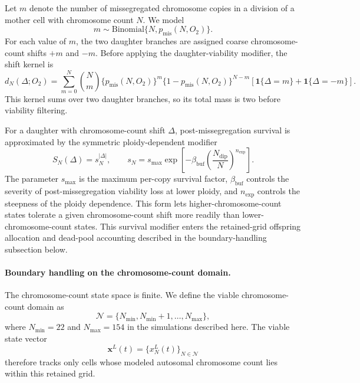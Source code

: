 \documentclass[11pt]{article}
\begin{document}
Let $m$ denote the number of missegregated chromosome copies in a division of a mother cell with chromosome count $N$. We model
\begin{equation}
m \sim \mathrm{Binomial}\{N,p_{\mathrm{mis}}(N,O_2)\}.
\label{eq:appendix_misseg_binomial}
\end{equation}
For each value of $m$, the two daughter branches are assigned coarse chromosome-count shifts $+m$ and $-m$. Before applying the daughter-viability modifier, the shift kernel is
\begin{equation}
d_N(\Delta;O_2)
=
\sum_{m=0}^{N}
\binom{N}{m}
\{p_{\mathrm{mis}}(N,O_2)\}^{m}
\{1-p_{\mathrm{mis}}(N,O_2)\}^{N-m}
\left[
\mathbf{1}\{\Delta=m\}
+
\mathbf{1}\{\Delta=-m\}
\right].
\label{eq:appendix_shift_kernel}
\end{equation}
This kernel sums over two daughter branches, so its total mass is two before viability filtering.

For a daughter with chromosome-count shift $\Delta$, post-missegregation survival is approximated by the symmetric ploidy-dependent modifier
\begin{equation}
S_N(\Delta)=s_N^{|\Delta|},
\qquad
s_N
=
s_{\max}
\exp\left[
-\beta_{\mathrm{buf}}\left(\frac{N_{\mathrm{dip}}}{N}\right)^{n_{\mathrm{exp}}}
\right].
\label{eq:appendix_survival_kernel}
\end{equation}
The parameter $s_{\max}$ is the maximum per-copy survival factor, $\beta_{\mathrm{buf}}$ controls the severity of post-missegregation viability loss at lower ploidy, and $n_{\mathrm{exp}}$ controls the steepness of the ploidy dependence. This form lets higher-chromosome-count states tolerate a given chromosome-count shift more readily than lower-chromosome-count states.
This survival modifier enters the retained-grid offspring allocation and dead-pool accounting described in the boundary-handling subsection below.

\paragraph{Boundary handling on the chromosome-count domain.}
The chromosome-count state space is finite. We define the viable chromosome-count domain as
\[
\mathcal{N}=\{N_{\min},N_{\min}+1,\ldots,N_{\max}\},
\]
where $N_{\min}=22$ and $N_{\max}=154$ in the simulations described here. The viable state vector
\[
\mathbf{x}^L(t)=\{x^L_N(t)\}_{N\in\mathcal{N}}
\]
therefore tracks only cells whose modeled autosomal chromosome count lies within this retained grid.
\end{document}
